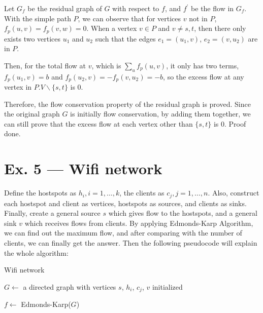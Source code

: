 \documentclass[12pt, a4paper]{article}
\begin{document}
Let $G_f$ be the residual graph of $G$ with respect to $f$, and $f^\prime$ be the flow in $G_f$. 
With the simple path $P$, we can observe that for vertices $v$ not in $P$, $f_p(u, v) = f_p(v, w) = 0$. 
When a vertex $v\in P$ and $v\neq s, t$, then there only exists two vertices $u_1$ and $u_2$ such that the edges $e_1 = (u_1, v)$, 
$e_2 = (v, u_2)$ are in $P$. 

Then, for the total flow at $v$, which is $\sum_u f_p(u, v)$, it only has two terms, 
$f_p(u_1, v) = b$ and $f_p(u_2, v) = -f_p(v, u_2) = -b$, so the excess flow at any vertex in $P.V\backslash \{s, t\}$ is 0.

Therefore, the flow conservation property of the residual graph is proved. Since the original graph $G$ is initially flow conservation, 
by adding them together, we can still prove that the excess flow at each vertex other than $\{s,t\}$ is 0. Proof done.

\section*{Ex. 5 --- Wifi network}
Define the hostspots as $h_i, i = 1,\dots, k$, the clients as $c_j, j = 1,\dots,n$. Also, construct each hostspot and client as vertices, 
hostspots as sources, and clients as sinks. Finally, create a general source $s$ which gives flow to the hostspots, 
and a general sink $v$ which receives flows from clients. By applying Edmonds-Karp Algorithm, we can find out the maximum flow, 
and after comparing with the number of clients, we can finally get the answer.
Then the following pseudocode will explain the whole algorithm:

\begin{algorithm}[!htb]
    \caption{Wifi network}

    $G \leftarrow$ a directed graph with vertices $s$, $h_i$, $c_j$, $v$ initialized\;


    $f \leftarrow$ Edmonds-Karp($G$)\;
\end{algorithm}
\end{document}
